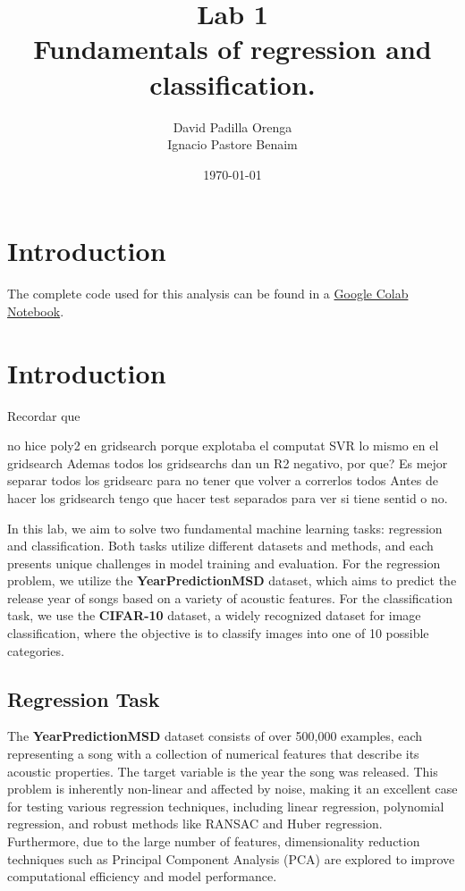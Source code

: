 \documentclass[twocolumn]{article}
\title{Lab 1 \\ \small Fundamentals of regression and classiﬁcation.}
\author{David Padilla Orenga\\ Ignacio Pastore Benaim}
\date{\today}   %
\begin{document}
\maketitle

\section{Introduction}


The complete code used for this analysis can be found in a \href{https://colab.research.google.com/drive/1Gg35b8epwsI3nkCeiqCgBeFCd3aNdahI?usp=sharing}{Google Colab Notebook}.

\section{Introduction}

Recordar que

no hice poly2 en gridsearch porque explotaba el computat
SVR lo mismo en el gridsearch
Ademas todos los gridsearchs dan un R2 negativo, por que?
Es mejor separar todos los gridsearc para no tener que volver a correrlos todos
Antes de hacer los gridsearch tengo que hacer test separados para ver si tiene sentid o no.

In this lab, we aim to solve two fundamental machine learning tasks: regression and classification. Both tasks utilize different datasets and methods, and each presents unique challenges in model training and evaluation. For the regression problem, we utilize the \textbf{YearPredictionMSD} dataset, which aims to predict the release year of songs based on a variety of acoustic features. For the classification task, we use the \textbf{CIFAR-10} dataset, a widely recognized dataset for image classification, where the objective is to classify images into one of 10 possible categories.

\subsection{Regression Task}

The \textbf{YearPredictionMSD} dataset consists of over 500,000 examples, each representing a song with a collection of numerical features that describe its acoustic properties. The target variable is the year the song was released. This problem is inherently non-linear and affected by noise, making it an excellent case for testing various regression techniques, including linear regression, polynomial regression, and robust methods like RANSAC and Huber regression. Furthermore, due to the large number of features, dimensionality reduction techniques such as Principal Component Analysis (PCA) are explored to improve computational efficiency and model performance.
\end{document}
